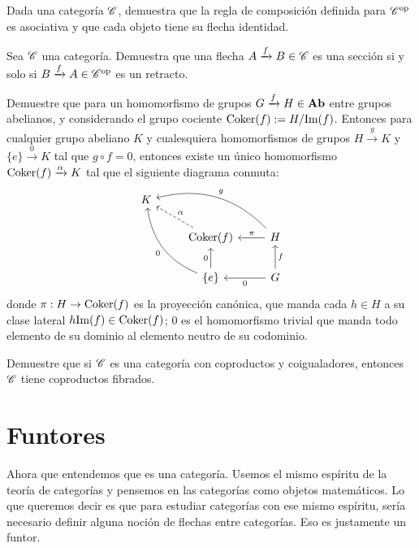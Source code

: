 \documentclass{comunicaciones}
\begin{document}
\begin{ex}
    Dada una categoría $\mathscr C$, demuestra que la regla de composición definida para $\mathscr C^{\mathrm{op}}$ es asociativa y que cada objeto tiene su flecha identidad.
\end{ex}

\begin{ex}
    Sea $\mathscr C$ una categoría. Demuestra que una flecha $A\xrightarrow{f}B\in\mathscr C$ es una sección si y solo si $B\xrightarrow{f}A\in\mathscr C^{\mathrm{op}}$ es un retracto.
\end{ex}

\begin{ex}
    Demuestre que para un homomorfismo de grupos $G\xrightarrow{f}H\in\mathbf{Ab}$ entre grupos abelianos, y considerando el grupo cociente $\mathrm{Coker}(f):=H/\mathrm{Im}(f)$. Entonces para cualquier grupo abeliano $K$ y
    cualesquiera homomorfismos de grupos $H\xrightarrow{g}K$ y $\{e\}\xrightarrow{0}K$ tal que $g\circ f=0$, entonces existe un único homomorfismo $\mathrm{Coker}(f)\xrightarrow{\alpha}K$ tal que 
    el siguiente diagrama conmuta:
    \[\begin{tikzcd}
                K &                                                        &                                                            \\
                  & {\Cokr(f)} \arrow[lu, "{\alpha}"', dashed]    & H \arrow[l, "\pi"'] \arrow[llu, "g"', bend right] \\
                  & \{e\} \arrow[u, "0"] \arrow[luu, "0", bend left] & G \arrow[u, "f"'] \arrow[l, "0"]                          
    \end{tikzcd}\]
    donde $\pi:H\to \mathrm{Coker}(f)$ es la proyección canónica, que manda cada $h\in H$ a su clase lateral $h\mathrm{Im}(f)\in \mathrm{Coker}(f)$; $0$ es el homomorfismo trivial que manda todo elemento de su dominio
    al elemento neutro de su codominio.
\end{ex}

\begin{ex}
    Demuestre que si $\mathscr C$ es una categoría con coproductos y coigualadores, entonces $\mathscr C$ tiene coproductos fibrados.
\end{ex}

\section{Funtores}

Ahora que entendemos que es una categoría. Usemos el mismo espíritu de la teoría de categorías y pensemos en las categorías como objetos matemáticos.
Lo que queremos decir es que para estudiar categorías con ese mismo espíritu, sería necesario definir alguna noción de flechas entre categorías. 
Eso es justamente un funtor.
\end{document}
